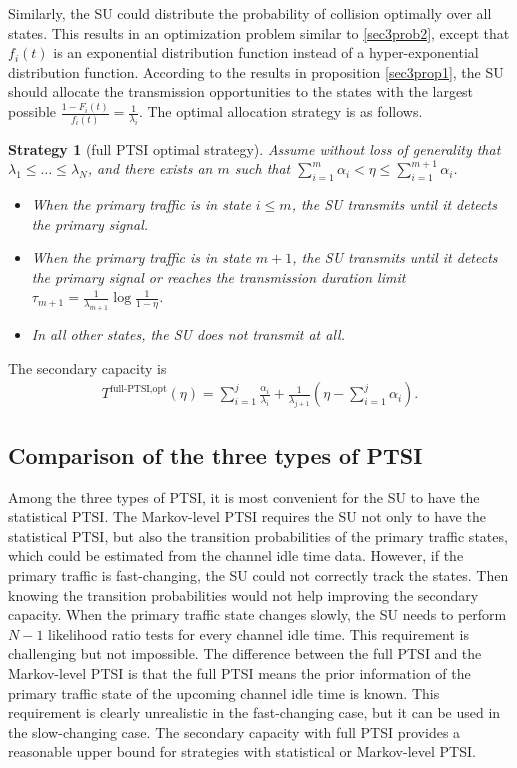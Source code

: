 \documentclass[10pt,final,journal,letterpaper]{IEEEtran}
\newtheorem{strategy}{Strategy}
\begin{document}
\par
Similarly, the SU could distribute the probability of collision optimally over all states. This results in an optimization problem similar to \eqref{sec3prob2}, except that $f_i(t)$ is an exponential distribution function instead of a hyper-exponential distribution function. According to the results in proposition \ref{sec3prop1}, the SU should allocate the transmission opportunities to the states with the largest possible $\frac{1-F_i(t)}{f_i(t)}=\frac{1}{\lambda_i}$. The optimal allocation strategy is as follows.
\begin{strategy}[full PTSI optimal strategy]
Assume without loss of generality that $\lambda_1\leq\ldots\leq\lambda_N$, and there exists an $m$ such that $\sum_{i=1}^m\alpha_i<\eta\leq\sum_{i=1}^{m+1}\alpha_i$.
\begin{itemize}
  \item When the primary traffic is in state $i\leq m$, the SU transmits until it detects the primary signal.
  \item When the primary traffic is in state $m+1$, the SU transmits until it detects the primary signal or reaches the transmission duration limit $\tau_{m+1}=\frac{1}{\lambda_{m+1}}\log\frac{1}{1-\eta}$.
  \item In all other states, the SU does not transmit at all.
\end{itemize}
\end{strategy}
The secondary capacity is
\begin{align}\label{sec3eq10}
    T^{\text{full-PTSI,opt}}(\eta)=\sum_{i=1}^{j}\frac{\alpha_i}{\lambda_i}+\frac{1}{\lambda_{j+1}}(\eta-\sum_{i=1}^j\alpha_i).
\end{align}

\subsection{Comparison of the three types of PTSI}
Among the three types of PTSI, it is most convenient for the SU to have the statistical PTSI. The Markov-level PTSI requires the SU not only to have the statistical PTSI, but also the transition probabilities of the primary traffic states, which could be estimated from the channel idle time data. However, if the primary traffic is fast-changing, the SU could not correctly track the states. Then knowing the transition probabilities would not help improving the secondary capacity. When the primary traffic state changes slowly, the SU needs to perform $N-1$ likelihood ratio tests for every channel idle time. This requirement is challenging but not impossible. The difference between the full PTSI and the Markov-level PTSI is that the full PTSI means the prior information of the primary traffic state of the upcoming channel idle time is known. This requirement is clearly unrealistic in the fast-changing case, but it can be used in the slow-changing case. The secondary capacity with full PTSI provides a reasonable upper bound for strategies with statistical or Markov-level PTSI.
\end{document}
